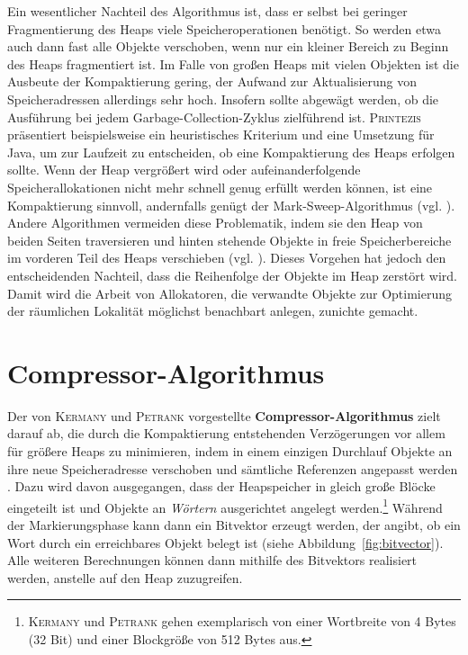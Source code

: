 Ein wesentlicher Nachteil des Algorithmus ist, dass er selbst bei geringer Fragmentierung des Heaps viele Speicheroperationen benötigt.
So werden etwa auch dann fast alle Objekte verschoben, wenn nur ein kleiner Bereich zu Beginn des Heaps fragmentiert ist.
Im Falle von großen Heaps mit vielen Objekten ist die Ausbeute der Kompaktierung gering, der Aufwand zur Aktualisierung von Speicheradressen allerdings sehr hoch.
Insofern sollte abgewägt werden, ob die Ausführung bei jedem Garbage-Collection-Zyklus zielführend ist.
\textsc{Printezis} präsentiert beispielsweise ein heuristisches Kriterium und eine Umsetzung für Java, um zur Laufzeit zu entscheiden, ob eine Kompaktierung des Heaps erfolgen sollte.
Wenn der Heap vergrößert wird oder aufeinanderfolgende Speicherallokationen nicht mehr schnell genug erfüllt werden können, ist eine Kompaktierung sinnvoll, andernfalls genügt der Mark-Sweep-Algorithmus (vgl. \cite[Kap. 3.4]{printezis2001}).
Andere Algorithmen vermeiden diese Problematik, indem sie den Heap von beiden Seiten traversieren und hinten stehende Objekte in freie Speicherbereiche im vorderen Teil des Heaps verschieben (vgl. \cite[S. 32f]{handbook}).
Dieses Vorgehen hat jedoch den entscheidenden Nachteil, dass die Reihenfolge der Objekte im Heap zerstört wird.
Damit wird die Arbeit von Allokatoren, die verwandte Objekte zur Optimierung der räumlichen Lokalität möglichst benachbart anlegen, zunichte gemacht.




\section{Compressor-Algorithmus}
\label{sec:compressor}

Der von \textsc{Kermany} und \textsc{Petrank} vorgestellte \textbf{Compressor-Algorithmus} zielt darauf ab, die durch die Kompaktierung entstehenden Verzögerungen vor allem für größere Heaps zu minimieren, indem in einem einzigen Durchlauf Objekte an ihre neue Speicheradresse verschoben und sämtliche Referenzen angepasst werden \cite{kermany2006}.
Dazu wird davon ausgegangen, dass der Heapspeicher in gleich große Blöcke eingeteilt ist und Objekte an \textit{Wörtern} ausgerichtet angelegt werden.\footnote{\textsc{Kermany} und \textsc{Petrank} gehen exemplarisch von einer Wortbreite von 4 Bytes (32 Bit) und einer Blockgröße von 512 Bytes aus.}
Während der Markierungsphase kann dann ein Bitvektor erzeugt werden, der angibt, ob ein Wort durch ein erreichbares Objekt belegt ist (siehe Abbildung~\ref{fig:bitvector}).
Alle weiteren Berechnungen können dann mithilfe des Bitvektors realisiert werden, anstelle auf den Heap zuzugreifen.

